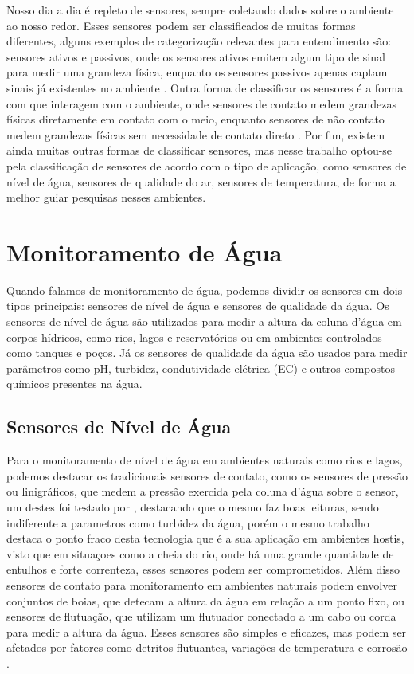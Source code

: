 Nosso dia a dia é repleto de sensores, sempre coletando dados sobre o ambiente ao nosso redor. Esses sensores podem ser classificados de muitas formas diferentes, alguns exemplos de categorização relevantes para entendimento são: sensores ativos e passivos, onde os sensores ativos emitem algum tipo de sinal para medir uma grandeza física, enquanto os sensores passivos apenas captam sinais já existentes no ambiente \cite{javaid_2021_sensors}. Outra forma de classificar os sensores é a forma com que interagem com o ambiente, onde sensores de contato medem grandezas físicas diretamente em contato com o meio, enquanto sensores de não contato medem grandezas físicas sem necessidade de contato direto \cite{javaid_2021_sensors, mohindru_2023_development, wu_2023_a}. Por fim, existem ainda muitas outras formas de classificar sensores, mas nesse trabalho optou-se pela classificação de sensores de acordo com o tipo de aplicação, como sensores de nível de água, sensores de qualidade do ar, sensores de temperatura, de forma a melhor guiar pesquisas nesses ambientes. 


\section{Monitoramento de Água}\label{sec:water_monitoring}

Quando falamos de monitoramento de água, podemos dividir os sensores em dois tipos principais: sensores de nível de água e sensores de qualidade da água. Os sensores de nível de água são utilizados para medir a altura da coluna d'água em corpos hídricos, como rios, lagos e reservatórios ou em ambientes controlados como tanques e poços. Já os sensores de qualidade da água são usados para medir parâmetros como pH, turbidez, condutividade elétrica (EC) e outros compostos químicos presentes na água.

\subsection{Sensores de Nível de Água}\label{subsec:water_level_sensors}

Para o monitoramento de nível de água em ambientes naturais como rios e lagos, podemos destacar os tradicionais sensores de contato, como os sensores de pressão ou linigráficos, que medem a pressão exercida pela coluna d'água sobre o sensor, um destes foi testado por \textcite{santana_2024_development}, destacando que o mesmo faz boas leituras, sendo indiferente a parametros como turbidez da água, porém o mesmo trabalho destaca o ponto fraco desta tecnologia que é a sua aplicação em ambientes hostis, visto que em situaçoes como a cheia do rio, onde há uma grande quantidade de entulhos e forte correnteza, esses sensores podem ser comprometidos. Além disso sensores de contato para monitoramento em ambientes naturais podem envolver conjuntos de boias, que detecam a altura da água em relação a um ponto fixo, ou sensores de flutuação, que utilizam um flutuador conectado a um cabo ou corda para medir a altura da água. Esses sensores são simples e eficazes, mas podem ser afetados por fatores como detritos flutuantes, variações de temperatura e corrosão \cite{mohammadrezamasoudimoghaddam_2024_a,santana_2024_development,paul_2020_a,yukawa_2025_an} .

